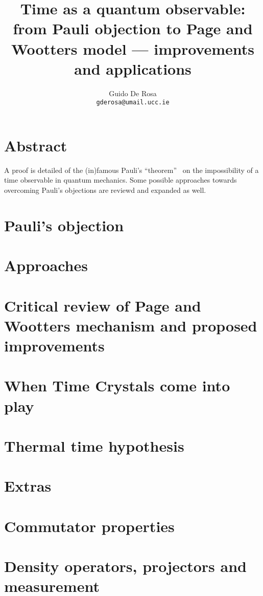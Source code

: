 \documentclass{book}
\author{Guido De Rosa \\ \small\tt{gderosa@umail.ucc.ie}}
\title{Time as a quantum observable: from Pauli objection to Page and Wootters model --- improvements and applications}
\begin{document}
\maketitle

\tableofcontents

\chapter*{Abstract}
A proof is detailed of the (in)famous Pauli's ``theorem''~\cite{PauliFootnote}
on the impossibility of a time observable in quantum mechanics. Some possible
approaches towards overcoming Pauli's objections are reviewd and expanded as well.

\chapter{Pauli's objection}



\chapter{Approaches}


\chapter{Critical review of Page and Wootters mechanism and proposed improvements}



\chapter{When Time Crystals come into play}


\chapter{Thermal time hypothesis}


\chapter{Extras}


\appendix
\chapter{Commutator properties}

\chapter{Density operators, projectors and measurement}


\printbibliography[title=References]
\end{document}
